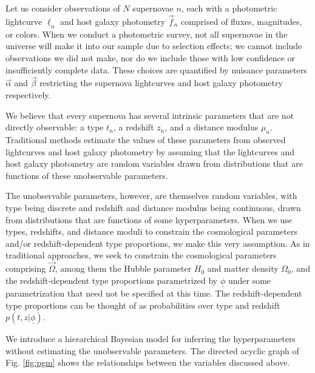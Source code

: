 \documentclass[12pt, onecolumn]{emulateapj}
\newcommand{\textul}{\underline}
\begin{document}
Let us consider observations of $N$ supernovae $n$, each with a photometric lightcurve $\textul{\ell}_{n}$ and host galaxy photometry $\vec{f}_{n}$ comprised of fluxes, magnitudes, or colors.  When we conduct a photometric survey, not all supernovae in the universe will make it into our sample due to selection effects; we cannot include observations we did not make, nor do we include those with low confidence or insufficiently complete data.  These choices are quantified by nuisance parameters $\vec{\alpha}$ and $\vec{\beta}$ restricting the supernova lightcurves and host galaxy photometry respectively.  

We believe that every supernova has several intrinsic parameters that are not directly observable: a type $t_{n}$, a redshift $z_{n}$, and a distance modulus $\mu_{n}$.   Traditional methods estimate the values of these parameters from observed lightcurves and host galaxy photometry by assuming that the lightcurves and host galaxy photometry are random variables drawn from distributions that are functions of these unobservable parameters.
 
The unobservable parameters, however, are themselves random variables, with type being discrete and redshift and distance modulus being continuous, drawn from distributions that are functions of some hyperparameters.  When we use types, redshifts, and distance moduli to constrain the cosmological parameters and/or redshift-dependent type proportions, we make this very assumption.  As in traditional approaches, we seek to constrain the cosmological parameters comprising $\vec{\Omega}$, among them the Hubble parameter $H_{0}$ and matter density $\Omega_{0}$, and the redshift-dependent type proportions parametrized by $\textul{\phi}$ under some parametrization that need not be specified at this time.  The redshift-dependent type proportions can be thought of as probabilities over type and redshift $p(t, z | \textul{\phi})$.

We introduce a hierarchical Bayesian model for inferring the hyperparameters without estimating the unobservable parameters.  The directed acyclic graph of Fig. \ref{fig:pgm} shows the relationships between the variables discussed above.
\end{document}
